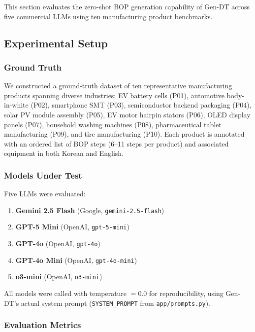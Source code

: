 This section evaluates the zero-shot BOP generation capability of Gen-DT across five commercial LLMs using ten manufacturing product benchmarks.

\subsection{Experimental Setup}

\subsubsection{Ground Truth}

We constructed a ground-truth dataset of ten representative manufacturing products spanning diverse industries: EV battery cells (P01), automotive body-in-white (P02), smartphone SMT (P03), semiconductor backend packaging (P04), solar PV module assembly (P05), EV motor hairpin stators (P06), OLED display panels (P07), household washing machines (P08), pharmaceutical tablet manufacturing (P09), and tire manufacturing (P10).
Each product is annotated with an ordered list of BOP steps (6--11 steps per product) and associated equipment in both Korean and English.

\subsubsection{Models Under Test}

Five LLMs were evaluated:
\begin{enumerate}
    \item \textbf{Gemini 2.5 Flash} (Google, \texttt{gemini-2.5-flash})
    \item \textbf{GPT-5 Mini} (OpenAI, \texttt{gpt-5-mini})
    \item \textbf{GPT-4o} (OpenAI, \texttt{gpt-4o})
    \item \textbf{GPT-4o Mini} (OpenAI, \texttt{gpt-4o-mini})
    \item \textbf{o3-mini} (OpenAI, \texttt{o3-mini})
\end{enumerate}

All models were called with temperature $= 0.0$ for reproducibility, using Gen-DT's actual system prompt (\texttt{SYSTEM\_PROMPT} from \texttt{app/prompts.py}).

\subsubsection{Evaluation Metrics}

